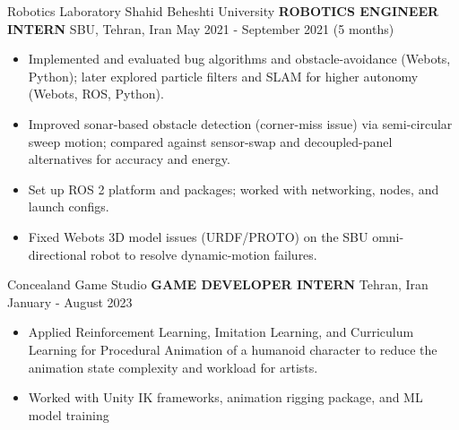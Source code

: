 \begin{cventries}
    \cventry
    {Robotics Laboratory \textemdash Shahid Beheshti University}
    {\textbf{ROBOTICS ENGINEER INTERN}}
    {SBU, Tehran, Iran}
    {May 2021 - September 2021 (5 months)}
    {
        \begin{itemize}
            \item Implemented and evaluated bug algorithms and obstacle-avoidance (Webots, Python); later explored particle filters and SLAM for higher autonomy (Webots, ROS, Python).
            \item Improved sonar-based obstacle detection (corner-miss issue) via semi-circular sweep motion; compared against sensor-swap and decoupled-panel alternatives for accuracy and energy.
            \item Set up ROS 2 platform and packages; worked with networking, nodes, and launch configs.
            \item Fixed Webots 3D model issues (URDF/PROTO) on the SBU omni-directional robot to resolve dynamic-motion failures.
        \end{itemize}
    }
\end{cventries}

\begin{cventries}
    \cventry
    {Concealand Game Studio}
    {\textbf{GAME DEVELOPER INTERN}}
    {Tehran, Iran}
    {January - August 2023}
    {
        \begin{itemize}    
            \item Applied Reinforcement Learning, Imitation Learning, and Curriculum Learning for Procedural Animation of a humanoid character to reduce the animation state complexity and workload for artists.
            \item Worked with Unity IK frameworks, animation rigging package, and ML model training
        \end{itemize}
    }
\end{cventries}



